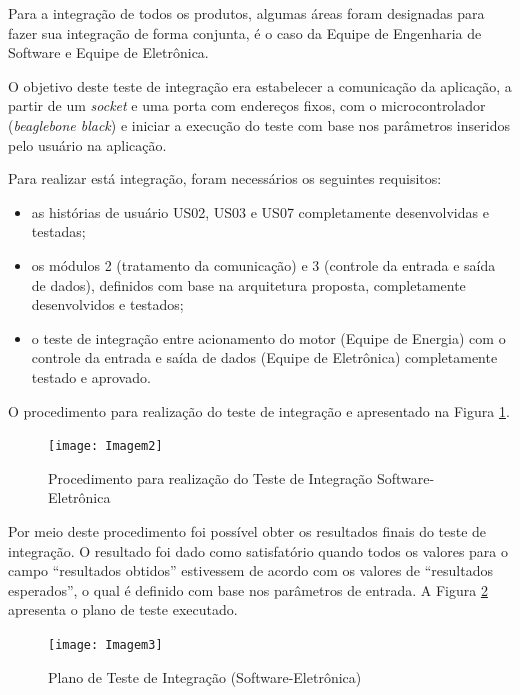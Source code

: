 
		Para a integração de todos os produtos, algumas áreas foram designadas para fazer sua integração de forma conjunta, é o caso da Equipe de Engenharia de Software e Equipe de Eletrônica.
		
		O objetivo deste teste de integração era estabelecer a comunicação da aplicação, a partir de um \textit{socket} e uma porta com endereços fixos, com o microcontrolador (\textit{beaglebone black}) e iniciar a execução do teste com base nos parâmetros inseridos pelo usuário na aplicação.
		
		Para realizar está integração, foram necessários os seguintes requisitos:

		\begin{itemize}
			\item as histórias de usuário US02, US03 e US07 completamente desenvolvidas e testadas;
			\item os módulos 2 (tratamento da comunicação) e 3 (controle da entrada e saída de dados), definidos com base na arquitetura proposta, completamente desenvolvidos e testados;
			\item o teste de integração entre acionamento do motor (Equipe de Energia) com o controle da entrada e saída de dados (Equipe de Eletrônica) completamente testado e aprovado.
		\end{itemize}

		O procedimento para realização do teste de integração e apresentado na Figura \ref{Imagem2}.
		\newpage
		\begin{figure}[htpb]
			\centering
			\texttt{[image: Imagem2]}
			\caption{Procedimento para realização do Teste de Integração Software-Eletrônica}
			\label{Imagem2}
		\end{figure}

		Por meio deste procedimento foi possível obter os resultados finais do teste de integração. O resultado foi dado como satisfatório quando todos os valores para o campo “resultados obtidos” estivessem de acordo com os valores de “resultados esperados”, o qual é definido com base nos parâmetros de entrada. A Figura \ref{Imagem3} apresenta o plano de teste executado.

		\begin{figure}[htpb]
			\centering
			\texttt{[image: Imagem3]}
			\caption{Plano de Teste de Integração (Software-Eletrônica)}
			\label{Imagem3}
		\end{figure}

